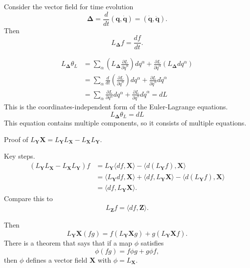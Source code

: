 \documentclass{article}
\begin{document}
Consider the vector field for time evolution
$$
\pmb \Delta =
\frac{d}{dt} (\mathbf q, \dot{\mathbf q})
=
(\dot{\mathbf q}, \ddot{\mathbf q})
.
$$
Then
$$
L_{\pmb \Delta} f = \frac{df}{dt}.
$$


$$
\begin{aligned}
L_{\pmb \Delta} \theta_L
&=
\sum_\alpha
  \left(L_{\pmb \Delta} \frac{ \partial L } { \partial {\dot q}^\alpha } \right) d q^\alpha
+
  \frac{ \partial L } { \partial \dot q^\alpha } ( L_{\pmb \Delta} d q^\alpha )
\\
&=
\sum_\alpha
  \frac{d}{dt}\left( \frac{ \partial L } { \partial {\dot q}^\alpha} \right) d q^\alpha
+
  \frac{ \partial L } { \partial {\dot q}^\alpha } d {\dot q}^\alpha
\\
&=
\sum_\alpha
  \frac{ \partial L } { \partial q^\alpha} d q^\alpha
+
  \frac{ \partial L } { \partial {\dot q}^\alpha } d {\dot q}^\alpha
= dL
\end{aligned}
$$
This is the coordinates-independent form of the Euler-Lagrange equations.
\begin{equation}
L_{\pmb \Delta} \theta_L = dL
\end{equation}
This equation contains multiple components, so it consists of multiple equations.

Proof of
$
L_{\mathbf Y} \mathbf X
=
L_{\mathbf Y} L_{\mathbf X} - L_{\mathbf X} L_{\mathbf Y}.
$

Key steps.
$$
\begin{aligned}
(L_{\mathbf Y} L_{\mathbf X} - L_{\mathbf X} L_{\mathbf Y})f
&=
L_{\mathbf Y} \langle df, \mathbf X\rangle
- \langle d(L_{\mathbf Y} f), \mathbf X \rangle
\\
&=
\langle L_{\mathbf Y} df, \mathbf X\rangle
+\langle df, L_{\mathbf Y} \mathbf X\rangle
- \langle d(L_{\mathbf Y} f), \mathbf X \rangle
\\
&=
\langle df, L_{\mathbf Y} \mathbf X\rangle.
\end{aligned}
$$
Compare this to
$$
\begin{aligned}
L_{\mathbf Z} f = \langle df, \mathbf Z \rangle.
\end{aligned}
$$


Then
$$
L_{\mathbf Y} \mathbf X (f g)
=
f (L_{\mathbf Y} \mathbf X g)
+
g (L_{\mathbf Y} \mathbf X f).
$$
There is a theorem that says that if a map $\phi$ satisfies
$$
\phi (f g)
=
f \phi g
+
g \phi f,
$$
then $\phi$ defines a vector field $\mathbf X$
with $\phi = L_{\mathbf X}$.
\end{document}
